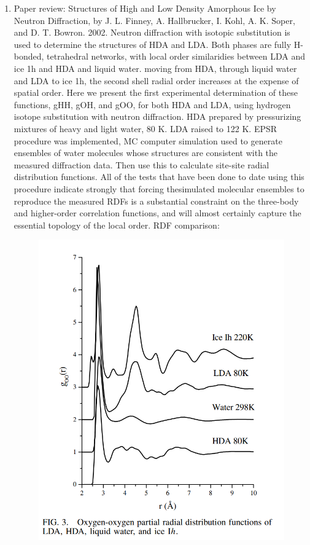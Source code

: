 \documentclass[12pt,reqno]{amsart}
\numberwithin{equation}{section}
\begin{document}
\begin{enumerate}
\item Paper review: Structures of High and Low Density Amorphous Ice by Neutron Diffraction, by J. L. Finney, A. Hallbrucker, I. Kohl, A. K. Soper, and D. T. Bowron. 2002.  
\subitem Neutron diffraction with isotopic substitution is used to determine the structures of HDA and LDA.  Both phases are fully H-bonded, tetrahedral networks, with local order similaridies between LDA and ice 1h and HDA and liquid water.  moving from HDA, through liquid water and LDA to ice 1h, the second shell radial order increases at the expense of spatial order.  Here we present the first experimental determination of these functions, gHH, gOH, and gOO, for both HDA and LDA, using hydrogen isotope substitution with neutron diffraction.  HDA prepared by pressurizing mixtures of heavy and light water, 80 K.  LDA raised to 122 K.  EPSR procedure was implemented, MC computer simulation used to generate ensembles of water molecules whose structures are consistent with the measured diffraction data.  Then use this to calculate site-site radial distribution functions.  All of the tests that have been done to date using this procedure indicate strongly that forcing thesimulated molecular ensembles to reproduce the measured RDFs is a substantial constraint on the three-body and higher-order correlation functions, and will almost certainly capture the essential topology of the local order.  RDF comparison:
\begin{figure}[H]
\centering
\includegraphics[scale=0.6]{amorphous_ice}
\end{figure}


\end{enumerate}
\end{document}
